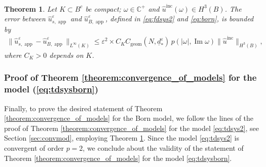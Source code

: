 \documentclass[]{article}
\newtheorem{theorem}{Theorem}
\numberwithin{equation}{section}
\numberwithin{theorem}{section}
\numberwithin{lemma}{section}
\numberwithin{corollary}{section}
\numberwithin{proposition}{section}
\numberwithin{definition}{section}
\newcommand{\bg}{\boldsymbol{g}}
\newcommand{\re}{\varepsilon}
\renewcommand{\Im}{\operatorname{Im}}
\newcommand{\inc}{\operatorname{inc}}
\newcommand{\app}{\operatorname{app}}
\begin{document}
\begin{appendices}
		\begin{theorem}
			\label{th:conv3}
			Let $K\subset B^c$ be compact; $\omega\in \mathbb{C}^+$ and $\hat{u}^{\inc}(\omega)\in H^3(B)$. The error between $\hat{u}^{\re}_{s,\operatorname{app}}$ and $\hat{u}^{\re}_{B,\operatorname{app}}$, defined in \eqref{eq:fdsys2} and \eqref{eq:born}, is bounded by
			\begin{align*}
				\|\hat{u}^{\re}_{s, \app} - \hat{u}^{\re}_{B, \app}\|_{L^{\infty}(K)}\leq \re^2 \times C_KC_{\operatorname{geom}}(N, \underline{d}_*^{\re}) \, p(|\omega|, \Im \omega)\|\hat{u}^{\inc}\|_{H^3(B)},
			\end{align*}
			where $C_K>0$ depends on $K$.
		\end{theorem}
		\subsubsection*{Proof of Theorem \ref{theorem:convergence_of_models} for the model (\ref{eq:tdsysborn})}
		
		Finally, to prove the desired statement of Theorem \ref{theorem:convergence_of_models} for the Born model, we follow the lines of the proof of Theorem \ref{theorem:convergence_of_models} for the model \eqref{eq:tdsys2}, see Section \ref{sec:convmod}, employing Theorem \ref{th:conv3}.
		Since the model \eqref{eq:tdsys2} is convergent of order $p=2$, we conclude about the validity of the statement of Theorem \ref{theorem:convergence_of_models} for the model \eqref{eq:tdsysborn}. 
		
	\end{appendices}
	
	 
	
\end{document}
